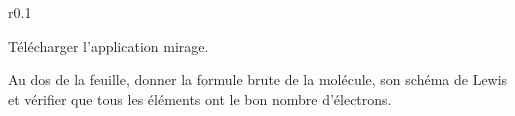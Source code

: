 \begin{wrapfigure}{r}{0.1\linewidth}
  \vspace*{-18pt}
\end{wrapfigure}

\mesure Télécharger l'application mirage.

\mesure Au dos de la feuille, donner la formule brute de la molécule, son schéma de Lewis et vérifier que tous les éléments ont le bon nombre d'électrons.